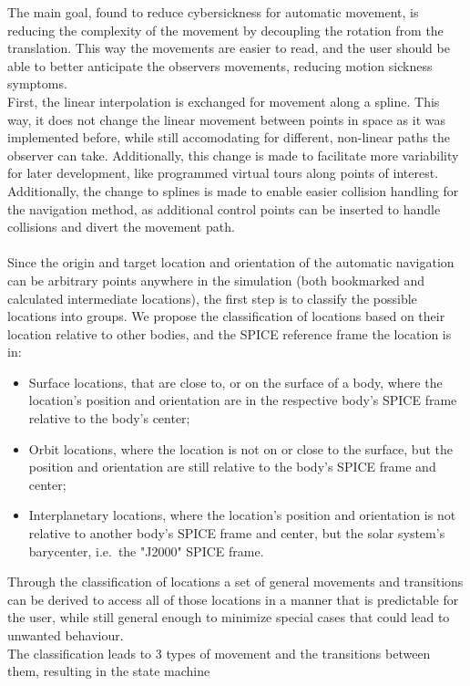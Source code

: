 The main goal, found to reduce cybersickness for automatic movement, is reducing the complexity of the movement by
decoupling the rotation from the translation.
This way the movements are easier to read, and the user should be able to better anticipate the observers movements,
reducing motion sickness symptoms.
\\
First, the linear interpolation is exchanged for movement along a spline.
This way, it does not change the linear movement between points in space as it was implemented before, while still
accomodating for different, non-linear paths the observer can take.
Additionally, this change is made to facilitate more variability for later development, like programmed virtual tours
along points of interest.
Additionally, the change to splines is made to enable easier collision handling for the navigation method, as
additional control points can be inserted to handle collisions and divert the movement path.
\\
\\
Since the origin and target location and orientation of the automatic navigation can be arbitrary points anywhere in
the simulation (both bookmarked and calculated intermediate locations), the first step is to classify the possible
locations into groups.
We propose the classification of locations based on their location relative to other bodies, and the SPICE reference
frame the location is in:
\begin{itemize}
    \item Surface locations, that are close to, or on the surface of a body, where the location's position and
    orientation are in the respective body's SPICE frame relative to the body's center;
    \item Orbit locations, where the location is not on or close to the surface, but the position and orientation
    are still relative to the body's SPICE frame and center;
    \item Interplanetary locations, where the location's position and orientation is not relative to another body's
    SPICE frame and center, but the solar system's barycenter, i.e.\ the "J2000" SPICE frame.
\end{itemize}
Through the classification of locations a set of general movements and transitions can be derived to access all of
those locations in a manner that is predictable for the user, while still general enough to minimize special cases
that could lead to unwanted behaviour.
\\
The classification leads to 3 types of movement and the transitions between them, resulting in the state machine

